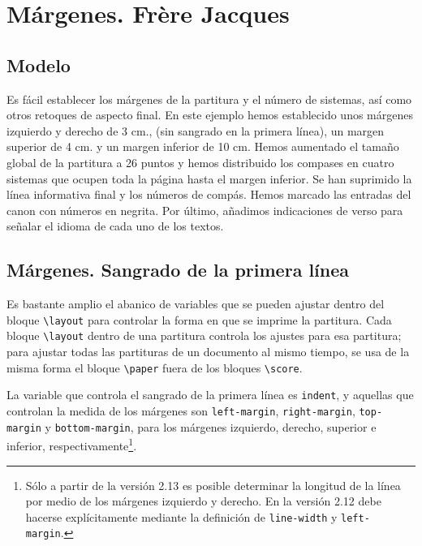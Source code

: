 \section{Márgenes. Frère Jacques}


\subsection{Modelo}

Es fácil establecer los márgenes de la partitura y el número de
sistemas, así como otros retoques de aspecto final. En este ejemplo
hemos establecido unos márgenes izquierdo y derecho de 3 cm., (sin
sangrado en la primera línea), un margen superior de 4 cm. y un margen
inferior de 10 cm.  Hemos aumentado el tamaño global de la partitura a
26 puntos y hemos distribuido los compases en cuatro sistemas que
ocupen toda la página hasta el margen inferior.  Se han suprimido la
línea informativa final y los números de compás.  Hemos marcado las
entradas del canon con números en negrita.  Por último, añadimos
indicaciones de verso para señalar el idioma de cada uno de los
textos.

\bigskip
\begin{center}
\end{center}
\bigskip



\subsection{Márgenes.  Sangrado de la primera línea}

Es bastante amplio el abanico de variables que se pueden ajustar
dentro del bloque \verb+\layout+ para controlar la forma en que se
imprime la partitura.  Cada bloque \verb+\layout+ dentro de una
partitura controla los ajustes para esa partitura; para ajustar todas
las partituras de un documento al mismo tiempo, se usa de la misma
forma el bloque \verb+\paper+ fuera de los bloques \verb+\score+.

La variable que controla el sangrado de la primera línea es
\verb+indent+, y aquellas que controlan la medida de los márgenes son
\verb+left-margin+, \verb+right-margin+, \verb+top-margin+ y
\verb+bottom-margin+, para los márgenes izquierdo, derecho, superior e
inferior, respectivamente\footnote{Sólo a partir de la versión 2.13 es
  posible determinar la longitud de la línea por medio de los márgenes
  izquierdo y derecho.  En la versión 2.12 debe hacerse explícitamente
  mediante la definición de \texttt{line-width} y
  \texttt{left-margin}.}.

